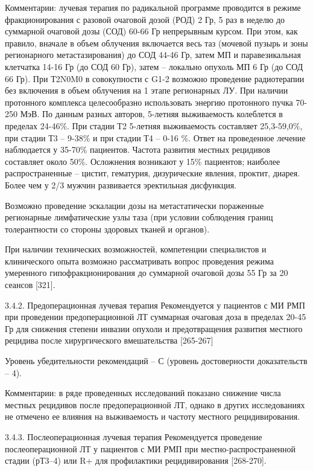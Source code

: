 Комментарии: лучевая терапия по радикальной программе проводится в режиме фракционирования с разовой очаговой дозой (РОД) 2 Гр, 5 раз в неделю до суммарной очаговой дозы (СОД) 60-66 Гр непрерывным курсом. При этом, как правило, вначале в объем облучения включается весь таз (мочевой пузырь и зоны регионарного метастазирования) до СОД 44-46 Гр, затем МП и паравезикальная клетчатка 14-16 Гр (до СОД 60 Гр), затем – локально опухоль МП 6 Гр (до СОД 66 Гр). При Т2N0M0 в совокупности с G1-2 возможно проведение радиотерапии без включения в объем облучения на 1 этапе регионарных ЛУ. При наличии протонного комплекса целесообразно использовать энергию протонного пучка 70-250 МэВ. По данным разных авторов, 5-летняя выживаемость колеблется в пределах 24-46\%. При стадии Т2 5-летняя выживаемость составляет 25,3-59,0\%, при стадии Т3 – 9-38\% и при стадии Т4 – 0-16 \%. Ответ на проведенное лечение наблюдается у 35-70\% пациентов. Частота развития местных рецидивов составляет около 50\%. Осложнения возникают у 15\% пациентов; наиболее распространенные – цистит, гематурия, дизурические явления, проктит, диарея. Более чем у 2/3 мужчин развивается эректильная дисфункция.

Возможно проведение эскалации дозы на метастатически пораженные регионарные лимфатические узлы таза (при условии соблюдения границ толерантности со стороны здоровых тканей и органов).

При наличии технических возможностей, компетенции специалистов и клинического опыта возможно рассматривать вопрос проведения режима умеренного гипофракционирования до суммарной очаговой дозы 55 Гр за 20 сеансов [321].

3.4.2. Предоперационная лучевая терапия
Рекомендуется у пациентов с МИ РМП при проведении предоперационной ЛТ суммарная очаговая доза в пределах 20-45 Гр для снижения степени инвазии опухоли и предотвращения развития местного рецидива после хирургического вмешательства [265-267]

Уровень убедительности рекомендаций – С (уровень достоверности доказательств – 4).

Комментарии: в ряде проведенных исследований показано снижение числа местных рецидивов после предоперационной ЛТ, однако в других исследованиях не отмечено ее влияния на выживаемость и частоту местного рецидивирования.

3.4.3. Послеоперационная лучевая терапия
Рекомендуется проведение послеоперационной ЛТ у пациентов с МИ РМП при местно-распространенной стадии (рТ3–4) или R+ для профилактики рецидивирования [268-270].

